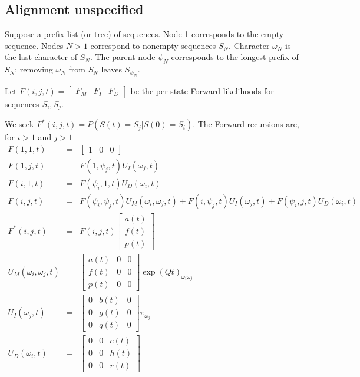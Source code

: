 \documentclass{article}
\begin{document}
\subsection{Alignment unspecified}

Suppose a prefix list (or tree) of sequences.
Node 1 corresponds to the empty sequence.
Nodes $N>1$ correspond to nonempty sequences $S_N$.
Character $\omega_N$ is the last character of $S_N$.
The parent node $\psi_N$ corresponds to the longest prefix of $S_N$:
removing $\omega_N$ from $S_N$ leaves $S_{\psi_N}$.

Let $F(i,j,t) = \begin{bmatrix} F_M & F_I & F_D \end{bmatrix}$
be the per-state Forward likelihoods for sequences $S_i,S_j$.

We seek $F^\ast(i,j,t) = P(S(t)=S_j|S(0)=S_i)$.
The Forward recursions are, for $i>1$ and $j>1$
\begin{eqnarray*}
F(1,1,t) & = & \begin{bmatrix} 1 & 0 & 0 \end{bmatrix}
\\
F(1,j,t) & = &
F(1,\psi_j,t) U_I(\omega_j,t)
\\
F(i,1,t) & = &
F(\psi_i,1,t) U_D(\omega_i,t)
\\
F(i,j,t) & = &
F(\psi_i,\psi_j,t) U_M(\omega_i,\omega_j,t)
+ F(i,\psi_j,t) U_I(\omega_j,t)
+ F(\psi_i,j,t) U_D(\omega_i,t)
\\
F^\ast(i,j,t) & = & F(i,j,t) \begin{bmatrix}
a(t) \\
f(t) \\
p(t) \end{bmatrix}
\\
U_M(\omega_i,\omega_j,t) & = &
\begin{bmatrix}
a(t) & 0 & 0 \\
f(t) & 0 & 0 \\
p(t) & 0 & 0 
\end{bmatrix}
\exp(Qt)_{\omega_i \omega_j}
\\
U_I(\omega_j,t) & = &
\begin{bmatrix}
0 & b(t) & 0 \\
0 & g(t) & 0 \\
0 & q(t) & 0 
\end{bmatrix}
\pi_{\omega_j}
\\
U_D(\omega_i,t) & = &
\begin{bmatrix}
0 & 0 & c(t) \\
0 & 0 & h(t) \\
0 & 0 & r(t) 
\end{bmatrix}
\end{eqnarray*}
\end{document}
